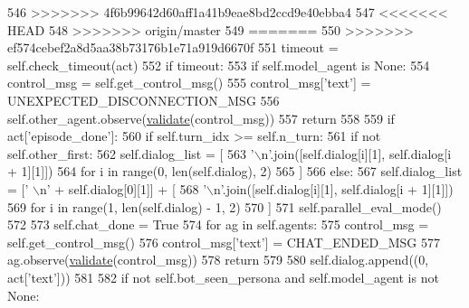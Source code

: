 \begin{DoxyCode}
546 >>>>>>> 4f6b99642d60aff1a41b9eae8bd2ccd9e40ebba4
547 <<<<<<< HEAD
548 >>>>>>> origin/master
549 =======
550 >>>>>>> ef574cebef2a8d5aa38b73176b1e71a919d6670f
551         timeout = self.check\_timeout(act)
552         \textcolor{keywordflow}{if} timeout:
553             \textcolor{keywordflow}{if} self.model\_agent \textcolor{keywordflow}{is} \textcolor{keywordtype}{None}:
554                 control\_msg = self.get\_control\_msg()
555                 control\_msg[\textcolor{stringliteral}{'text'}] = UNEXPECTED\_DISCONNECTION\_MSG
556                 self.other\_agent.observe(\hyperlink{namespaceparlai_1_1core_1_1worlds_afc3fad603b7bce41dbdc9cdc04a9c794}{validate}(control\_msg))
557             \textcolor{keywordflow}{return}
558 
559         \textcolor{keywordflow}{if} act[\textcolor{stringliteral}{'episode\_done'}]:
560             \textcolor{keywordflow}{if} self.turn\_idx >= self.n\_turn:
561                 \textcolor{keywordflow}{if} \textcolor{keywordflow}{not} self.other\_first:
562                     self.dialog\_list = [
563                         \textcolor{stringliteral}{'\(\backslash\)n'}.join([self.dialog[i][1], self.dialog[i + 1][1]])
564                         \textcolor{keywordflow}{for} i \textcolor{keywordflow}{in} range(0, len(self.dialog), 2)
565                     ]
566                 \textcolor{keywordflow}{else}:
567                     self.dialog\_list = [\textcolor{stringliteral}{' \(\backslash\)n'} + self.dialog[0][1]] + [
568                         \textcolor{stringliteral}{'\(\backslash\)n'}.join([self.dialog[i][1], self.dialog[i + 1][1]])
569                         \textcolor{keywordflow}{for} i \textcolor{keywordflow}{in} range(1, len(self.dialog) - 1, 2)
570                     ]
571                 self.parallel\_eval\_mode()
572 
573                 self.chat\_done = \textcolor{keyword}{True}
574                 \textcolor{keywordflow}{for} ag \textcolor{keywordflow}{in} self.agents:
575                     control\_msg = self.get\_control\_msg()
576                     control\_msg[\textcolor{stringliteral}{'text'}] = CHAT\_ENDED\_MSG
577                     ag.observe(\hyperlink{namespaceparlai_1_1core_1_1worlds_afc3fad603b7bce41dbdc9cdc04a9c794}{validate}(control\_msg))
578             \textcolor{keywordflow}{return}
579 
580         self.dialog.append((0, act[\textcolor{stringliteral}{'text'}]))
581 
582         \textcolor{keywordflow}{if} \textcolor{keywordflow}{not} self.bot\_seen\_persona \textcolor{keywordflow}{and} self.model\_agent \textcolor{keywordflow}{is} \textcolor{keywordflow}{not} \textcolor{keywordtype}{None}:

\end{DoxyCode}
